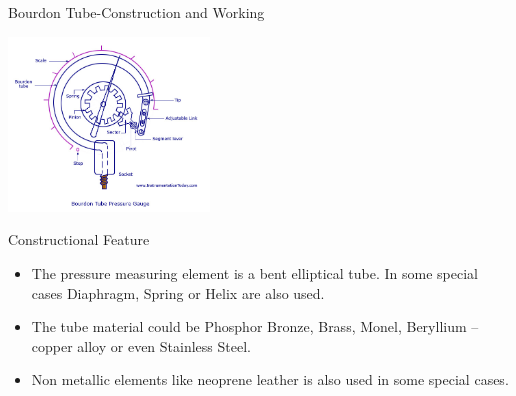 \documentclass[11pt]{beamer}
\begin{document}
\begin{frame}{Bourdon Tube-Construction and Working}

      \begin{center}
			\includegraphics[width=0.4\textwidth]{Bourdon-Tube-Pressure-Gauge.jpg}
		\end{center}
      
       \begin{exampleblock}{Constructional Feature}
          \begin{itemize}
           
           \item The pressure measuring element is a bent elliptical tube. In some special cases Diaphragm, Spring or  Helix are also used.
           \item The tube material could be Phosphor Bronze, Brass, Monel, Beryllium – copper alloy or even Stainless Steel. 
           \item Non metallic elements like neoprene leather is also used in some special cases.
           
          \end{itemize}
        
       
       \end{exampleblock}


\end{frame}
\end{document}
